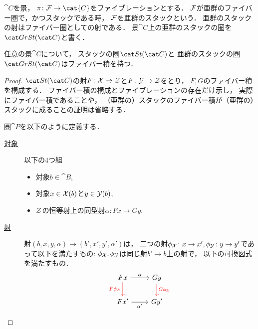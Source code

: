     \begin{Def}
        $\cat{C}$を景，
        $\pi \colon \stF \to \cat{C}$をファイブレーションとする．
        $\mathcal{F}$が亜群のファイバー圏で，かつスタックである時，
        $\mathcal{F}$を亜群のスタックという．
        亜群のスタックの射はファイバー圏としての射である．
        景$\cat{C}$上の亜群のスタックの圏を$\GrSt{C}$と書く．
    \end{Def}
    
    \begin{Prop}\label{prop:St_GrSt_has_fibprod}
        任意の景$\cat{C}$について，
        スタックの圏$\St{C}$と
        亜群のスタックの圏$\GrSt{C}$はファイバー積を持つ．
    \end{Prop}
    \begin{proof}
        $\St{C}$の射$F \colon \mathcal{X} \to \mathcal{Z}$と$F \colon \mathcal{Y} \to \mathcal{Z}$をとり，
        $F, G$のファイバー積を構成する．
        ファイバー積の構成とファイブレーションの存在だけ示し，
        実際にファイバー積であることや，
        （亜群の）スタックのファイバー積が（亜群の）スタックに成ることの証明は省略する．

        圏$\cat{P}$を以下のように定義する．
        \begin{description}
            \item[\underline{対象}]
                以下の$4$つ組
                \begin{itemize}
                    \item 対象$b \in \cat{B}$,
                    \item 対象$x \in \mathcal{X}(b)$と$y \in \mathcal{Y}(b)$,
                    \item $\mathcal{Z}$の恒等射上の同型射$\alpha \colon Fx \to Gy$.
                \end{itemize}
            
            \item[\underline{射}] \mnewline
                射$(b, x, y, \alpha) \to (b', x', y', \alpha')$は，
                二つの射$\phi_{\mathcal{X}} \colon x \to x', \phi_{\mathcal{Y}} \colon y \to y'$であって以下を満たすもの:
                $\phi_{\mathcal{X}}, \phi_{\mathcal{Y}}$は同じ射$b' \to b$上の射で，
                以下の可換図式を満たすもの．
                \[
                \begin{tikzcd}
                    Fx \ar[d, red, "F\phi_{\stX}"']\ar[r, "\alpha"]& Gy \ar[d, red, "G\phi_{\stY}"]\\
                    Fx' \ar[r, "\alpha'"']& Gy'
                \end{tikzcd}
                \]
        \end{description}


\end{proof}

